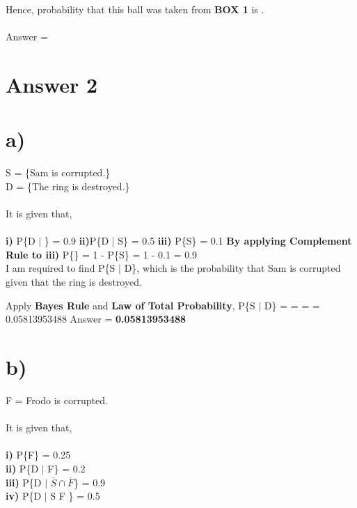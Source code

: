 \documentclass[11pt]{article}
\begin{document}
Hence, probability that this ball was taken from \textbf{BOX 1} is \textbf{}. \\ \\ 


\noindent Answer = \textbf{}



\newpage
\section*{Answer 2}
\section*{a)}
S = \{Sam is corrupted.\} \\
D = \{The ring is destroyed.\}
\\ \\ It is given that, \\ \\ 
\textbf{i)} P\{D $|$ \} = 0.9 \newline
\textbf{ii)}P\{D | S\} = 0.5 \newline
\textbf{iii)} P\{S\} = 0.1 \newline \newline 
\textbf{By applying Complement Rule to iii)} \longrightarrow P\{\} = 1 - P\{S\} = 1 - 0.1 = 0.9 \\

\noindent I am required to find P\{S $|$ D\}, which is the probability that Sam is corrupted given that the ring is destroyed. \newline

\noindent Apply \textbf{Bayes Rule} and \textbf{Law of Total Probability}, \newline \newline
\noindent
P\{S $|$ D\} =  =  =  = 0.05813953488 \newline \newline
\noindent Answer = \textbf{0.05813953488}

\section*{b)}
F = {Frodo is corrupted.} \\ \\ 
It is given that, \\ \\
\textbf{i)} P\{F\} = 0.25 \\
\textbf{ii)} P\{D $|$ F\} = 0.2 \\
\textbf{iii)} P\{D $|$ $\overline{S} \cap \overline{F}$\} = 0.9 \\
\textbf{iv)} P\{D $|$ S \cap F \}  = 0.5 \\
\end{document}
